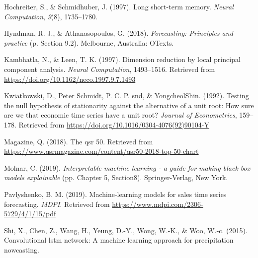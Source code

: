 \documentclass[12pt,oneside]{chicagocapstone}
\begin{document}
\leavevmode\hypertarget{ref-hochreiter1997}{}%
Hochreiter, S., \& Schmidhuber, J. (1997). Long short-term memory. \emph{Neural Computation}, \emph{9}(8), 1735--1780.

\leavevmode\hypertarget{ref-hyndman2018}{}%
Hyndman, R. J., \& Athanasopoulos, G. (2018). \emph{Forecasting: Principles and practice} (p. Section 9.2). Melbourne, Australia: OTexts.

\leavevmode\hypertarget{ref-kambhatla1997}{}%
Kambhatla, N., \& Leen, T. K. (1997). Dimension reduction by local principal component analysis. \emph{Neural Computation}, 1493--1516. Retrieved from \href{https://doi.org/10.1162/neco.1997.9.7.1493\%20}{https://doi.org/10.1162/neco.1997.9.7.1493 }

\leavevmode\hypertarget{ref-kwiatkowski1992}{}%
Kwiatkowski, D., Peter Schmidt, P. C. P. snd, \& YongcheolShin. (1992). Testing the null hypothesis of stationarity against the alternative of a unit root: How sure are we that economic time series have a unit root? \emph{Journal of Econometrics}, 159--178. Retrieved from \url{https://doi.org/10.1016/0304-4076(92)90104-Y}

\leavevmode\hypertarget{ref-qsr50}{}%
Magazine, Q. (2018). The qsr 50. Retrieved from \url{https://www.qsrmagazine.com/content/qsr50-2018-top-50-chart}

\leavevmode\hypertarget{ref-molnar2019}{}%
Molnar, C. (2019). \emph{Interpretable machine learning - a guide for making black box models explainable} (pp. Chapter 5, Section8). Springer-Verlag, New York.

\leavevmode\hypertarget{ref-pavlyshenko2019}{}%
Pavlyshenko, B. M. (2019). Machine-learning models for sales time series forecasting. \emph{MDPI}. Retrieved from \url{https://www.mdpi.com/2306-5729/4/1/15/pdf}

\leavevmode\hypertarget{ref-shi2015}{}%
Shi, X., Chen, Z., Wang, H., Yeung, D.-Y., Wong, W.-K., \& Woo, W.-c. (2015). Convolutional lstm network: A machine learning approach for precipitation nowcasting.


\end{document}
